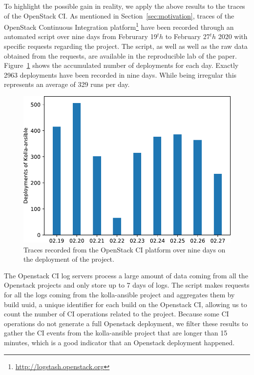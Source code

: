 To highlight the possible gain in reality, we apply the above results
to the traces of the OpenStack CI. As mentioned in Section~\ref{sec:motivation}, 
traces of the OpenStack Continuous Integration 
platform\footnote{\url{http://logstash.openstack.org}} have been recorded through 
an automated \python script over nine days from Februrary 19$^th$ to February 
27$^th$ 2020 with specific requests regarding the \kolla project. The script, as 
well as well as the raw data obtained from the requests, are available in the 
reproducible lab of the paper. Figure~\ref{fig:oci} shows the accumulated number 
of \kolla deployments for each day. Exactly 2963 deployments have been recorded in 
nine days. While being irregular this represents an average of 329 runs per day.


\begin{figure}[tbp]
	\begin{center}
		\includegraphics[width=0.9\linewidth]{./images/kolla_deployments.pdf}
	\end{center}
	\caption{Traces recorded from the OpenStack CI platform over nine days on the 
	deployment of the \kolla project.}
	\label{fig:oci}
\end{figure}

The Openstack CI log servers process a large amount of data coming from all
the Openstack projects and only store up to 7 days of logs. The script makes
requests for all the logs coming from the kolla-ansible project and aggregates
them by build uuid, a unique identifier for each build on the Openstack CI,
allowing us to count the number of CI operations related to the project.
Because some CI operations do not generate a full Openstack deployment, we filter
these results to gather the CI events from the kolla-ansible project that are
longer than 15 minutes, which is a good indicator that an Openstack deployment
happened.

